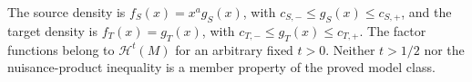 The source density is \(f_S(x)=x^ag_S(x)\), with \(c_{S,-}\le g_S(x)\le c_{S,+}\), and the target density is \(f_T(x)=g_T(x)\), with \(c_{T,-}\le g_T(x)\le c_{T,+}\). The factor functions belong to \(\mathcal H^t(M)\) for an arbitrary fixed \(t>0\). Neither \(t>1/2\) nor the nuisance-product inequality is a member property of the proved model class.